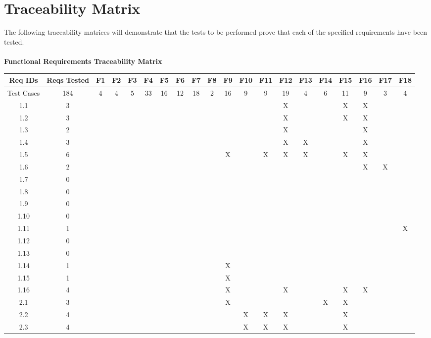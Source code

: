 \documentclass[titlepage]{article}
\begin{document}
\section{Traceability Matrix}
The following traceability matrices will demonstrate that the tests to be performed prove that each of the specified requirements have been tested.\\~\\
\large{\textbf{Functional Requirements Traceability Matrix}}
\begin{center}
\begin{table}[h!]
\hspace*{-7.5mm}
\begin{tabular}{|c|c|c|c|c |c|c|c|c|c |c|c|c|c|c |c|c|c|c|c|}\hline
\multicolumn{1}{|C{1.5}|}{Req IDs}	&\multicolumn{1}{|C{1}|}{Reqs Tested}	&F1	&F2	&F3	&F4	&F5	&F6	&F7	&F8	&F9	&F10	&F11	&F12	&F13	&F14	&F15	&F16	&F17	&F18\\\hline
\multicolumn{1}{|C{1.5}|}{Test Cases}&184 &4 &4 &5 &33 &16 &12 &18 &2 &16 &9 &9 &19 &4 &6 &11 &9 &3 &4\\\hline
1.1 &3&&& &&&&& &&&&X& &&X&X&&\\\hline
1.2 &3&&& &&&&& &&&&X& &&X&X&&\\\hline
1.3 &2&&& &&&&& &&&&X& &&&X&&\\\hline
1.4 &3&&& &&&&& &&&&X&X &&&X&&\\\hline
1.5 &6&&& &&&&& &X&&X&X&X &&X&X&&\\\hline
1.6 &2&&& &&&&& &&&&& &&&X&X&\\\hline
1.7 &0&&& &&&&& &&&&& &&&&&\\\hline
1.8 &0&&& &&&&& &&&&& &&&&&\\\hline
1.9 &0&&& &&&&& &&&&& &&&&&\\\hline
1.10 &0&&& &&&&& &&&&& &&&&&\\\hline
1.11 &1&&& &&&&& &&&&& &&&&&X\\\hline
1.12 &0&&& &&&&& &&&&& &&&&&\\\hline
1.13 &0&&& &&&&& &&&&& &&&&&\\\hline
1.14 &1&&& &&&&& &X&&&& &&&&&\\\hline
1.15 &1&&& &&&&& &X&&&& &&&&&\\\hline
1.16 &4&&& &&&&& &X&&&X& &&X&X&&\\\hline
2.1 &3&&& &&&&& &X&&&& &X&X&&&\\\hline
2.2 &4&&& &&&&& &&X&X&X& &&X&&&\\\hline
2.3 &4&&& &&&&& &&X&X&X& &&X&&&\\\hline

\end{tabular}
\end{table}
\end{center}
\end{document}
